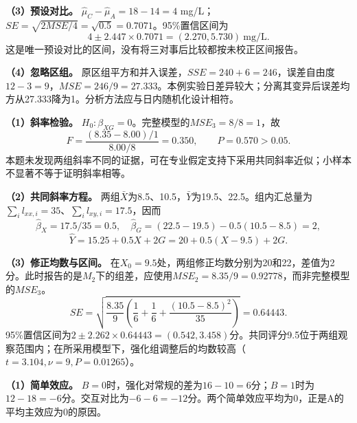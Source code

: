 \textbf{（3）预设对比。} \(\widehat\mu_C-\widehat\mu_A=18-14=4\) mg/L；\(SE=\sqrt{2MSE/4}=\sqrt{0.5}=0.7071\)。95\%置信区间为
\[
4\pm2.447\times0.7071=(2.270,5.730)\ \text{mg/L}.
\]
这是唯一预设对比的区间，没有将三对事后比较都按未校正区间报告。

\textbf{（4）忽略区组。} 原区组平方和并入误差，\(SSE=240+6=246\)，误差自由度\(12-3=9\)，\(MSE=246/9=27.333\)。本例实验日差异较大；分离其变异后误差均方从27.333降为1。分析方法应与日内随机化设计相符。
\par\nobreak\smallskip{}

\textbf{（1）斜率检验。} \(H_0:\beta_{XG}=0\)。完整模型的\(MSE_3=8/8=1\)，故
\[
F=\frac{(8.35-8.00)/1}{8.00/8}=0.350,
\qquad P=0.570>0.05.
\]
本题未发现两组斜率不同的证据，可在专业假定支持下采用共同斜率近似；小样本不显著不等于证明斜率相等。

\textbf{（2）共同斜率方程。} 两组\(\bar X\)为8.5、10.5，\(\bar Y\)为19.5、22.5。组内汇总量为\(\sum_i l_{xx,i}=35\)、\(\sum_i l_{xy,i}=17.5\)，因而
\[
\widehat\beta_X=17.5/35=0.5,\quad
\widehat\beta_G=(22.5-19.5)-0.5(10.5-8.5)=2,
\]
\[
\widehat Y=15.25+0.5X+2G
=20+0.5(X-9.5)+2G.
\]

\textbf{（3）修正均数与区间。} 在\(X_0=9.5\)处，两组修正均数分别为20和22，差值为2分。此时报告的是\(M_2\)下的组差，应使用\(MSE_2=8.35/9=0.92778\)，而非完整模型的\(MSE_3\)。
\[
SE=\sqrt{\frac{8.35}{9}\left(\frac16+\frac16+\frac{(10.5-8.5)^2}{35}\right)}
=0.64443.
\]
95\%置信区间为\(2\pm2.262\times0.64443=(0.542,3.458)\)分。共同评分9.5位于两组观察范围内；在所采用模型下，强化组调整后的均数较高（\(t=3.104,\nu=9,P=0.01265\)）。
\par\nobreak\smallskip{}

\textbf{（1）简单效应。} \(B=0\)时，强化对常规的差为\(16-10=6\)分；\(B=1\)时为\(12-18=-6\)分。交互对比为\(-6-6=-12\)分。两个简单效应平均为0，正是A的平均主效应为0的原因。

